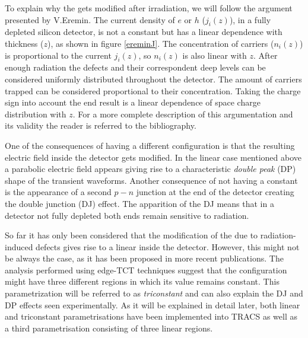To explain why the \neff gets modified after irradiation, we will follow the argument presented by V.Eremin\cite{Eremin}. The current density of $e$ or $h$ ($j_i(z)$), in a fully depleted silicon detector, is not a constant but has a linear dependence with thickness ($z$), as shown  in figure \ref{ereminJ}. The concentration of carriers ($n_i(z)$) is proportional to the current $j_i(z)$, so $n_i(z)$ is also linear with $z$. After enough radiation the defects and their correspondent deep levels can be considered uniformly distributed throughout the detector. The amount of carriers trapped can be considered proportional to their concentration. Taking the charge sign into account the end result is a linear dependence of space charge distribution with $z$. For a more complete description of this argumentation and its validity the reader is referred to the bibliography.


One of the consequences of having a different \neff configuration is that the resulting electric field inside the detector gets modified. In the linear case mentioned above a parabolic electric field appears giving rise to a characteristic \emph{double peak} (DP) shape of the transient waveforms. Another consequence of not having a constant \neff is the appearance of a second $p-n$ junction at the end of the detector creating the double junction (DJ) effect. The apparition of the DJ means that in a detector not fully depleted both ends remain sensitive to radiation.



So far it has only been considered that the modification of the \neff due to radiation-induced defects gives rise to a linear \neff inside the detector. However, this might not be always the case, as it has been proposed in more recent publications\cite{KramVertex}. The analysis performed using edge-TCT techniques suggest that the \neff configuration might have three different regions in which its value remains constant. This parametrization will be referred to as \emph{triconstant} and can also explain the DJ and DP effects seen experimentally. As it will be explained in detail later, both linear and triconstant parametrisations have been implemented into TRACS as well as a third parametrisation consisting of three linear regions.  

